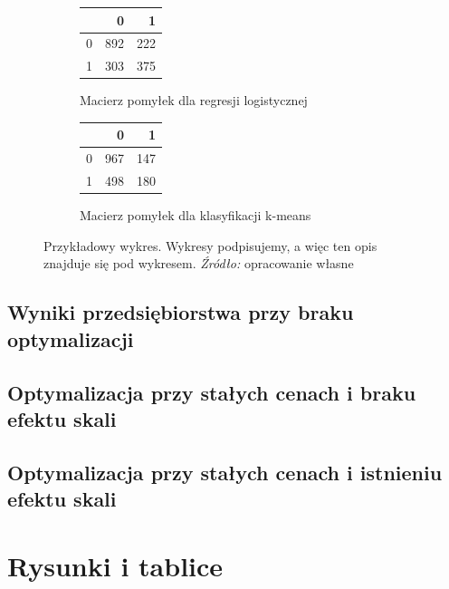 \documentclass[polish, twoside, 12pt, a4paper]{article}
\theoremstyle{definition}
\theoremstyle{plain}
\theoremstyle{remark}
\begin{document}
\begin{figure}[hbt]
  \centering
  \begin{subfigure}[t]{0.45\textwidth}

\begin{tabular}{rrr}
  \hline
 & 0 & 1 \\ 
  \hline
0 & 892 & 222 \\ 
  1 & 303 & 375 \\ 
   \hline
\end{tabular}
    \caption{Macierz pomyłek dla regresji logistycznej}
    \label{fig:xxxa}
  \end{subfigure}
  \hfill
  \begin{subfigure}[t]{0.45\textwidth}
\begin{tabular}{rrr}
  \hline
 & 0 & 1 \\ 
  \hline
0 & 967 & 147 \\ 
  1 & 498 & 180 \\ 
   \hline
\end{tabular}
    \caption{Macierz pomyłek dla klasyfikacji k-means}
    \label{fig:xxxb}
  \end{subfigure}
  
  \captionsetup{margin=10pt,font=small,labelfont=bf,width=.8\textwidth}

  \caption[Krótka nazwa II]{Przykładowy wykres. Wykresy podpisujemy, a więc ten opis znajduje się pod wykresem. \textit{Źródło:} opracowanie własne}\label{fig:xxx}
\end{figure}



\subsection{Wyniki przedsiębiorstwa przy braku optymalizacji}
\subsection{Optymalizacja przy stałych cenach i braku efektu skali}
\subsection{Optymalizacja przy stałych cenach i istnieniu efektu skali}



\clearpage
\section{Rysunki i tablice}
\end{document}
